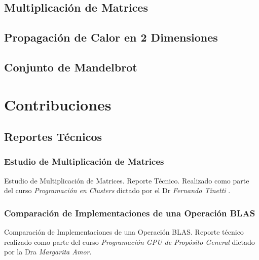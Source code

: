 \documentclass[a4paper]{report}
\begin{document}
\section{Multiplicación de Matrices}  \label{example-matrix}


\section{Propagación de Calor en 2 Dimensiones} \label{example-heat2d}


\section{Conjunto de Mandelbrot} \label{example-mandel}


\chapter{Contribuciones} \label{contributions}

\section{Reportes Técnicos}

\subsection{Estudio de Multiplicación de Matrices}

Estudio de Multiplicación de Matrices. Reporte Técnico. Realizado como parte del curso {\it Programación en Clusters} dictado por el Dr {\it Fernando Tinetti} \cite{mm-tool}.



\subsection{Comparación de Implementaciones de una Operación BLAS}

Comparación de Implementaciones de una Operación BLAS. Reporte técnico realizado como parte del curso {\it Programación GPU de Propósito General} dictado por la Dra {\it Margarita Amor}.


\end{document}
